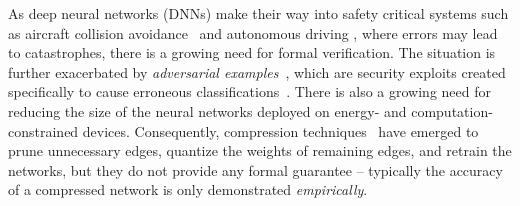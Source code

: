 \newcommand{\diffNN}{\textsc{ReluDiff}}
\newcommand{\ReluVal}{\textsc{ReluVal}}
\newcommand{\DeepPoly}{\textsc{DeepPoly}}

\newcommand{\Reluplex}{\textsc{Reluplex}}
\newcommand{\Neurify}{\textsc{Neurify}}
\newcommand{\RefineZono}{\textsc{RefineZono}}

\newcommand\UB[1]{\mathsf{UB}\big(#1\big)}
\newcommand\LB[1]{\mathsf{LB}\big(#1\big)}

\newcommand\UBconcrete[1]{\overline{\mathsf{UB}}\big(#1\big)}
\newcommand\LBconcrete[1]{\underline{\mathsf{LB}}\big(#1\big)}

\newcommand\ReLU[1]{\proc{ReLU}\left(#1\right)}
\newcommand\ReluOUT[1]{S(#1)}
\newcommand\ReluIN[1]{S^{in}(#1)}
\newcommand\ReluOUTdelta[1]{\delta(#1)}
\newcommand\ReluINdelta[1]{\delta^{in}(#1)}
\newcommand\EdgeOUTdelta[1]{\delta(#1)}

\newcommand\n[0]{n_{k,j}}
\newcommand\np[0]{n'_{k,j}}
\newcommand{\deq}{\Delta}
\newcommand{\deqh}{\hat{\Delta}}

\newcommand{\pluseq}{\mathrel{+}=}





\newcommand{\ignore}[1]{}
\newcommand{\textcode}[1]{\texttt{\footnotesize #1}}
\newcommand{\proc}[1]{\textsc{#1}}



As deep neural networks (DNNs) make their way into safety critical
systems such as aircraft collision avoidance~\cite{JulianKO18} and
autonomous driving \cite{bojarski2016end}, where errors may lead to
catastrophes, there is a growing need for formal verification.  The
situation is further exacerbated by \textit{adversarial
examples}~\cite{szegedy2013intriguing,GoodfellowSS15}, which are
security exploits created specifically to cause erroneous
classifications~\cite{NguyenYC15, XuQE16, Moosavi-Dezfooli16,
KurakinGB17a}.
%
There is also a growing need for reducing the size of the neural
networks deployed on energy- and computation-constrained devices.
Consequently, compression techniques~\cite{HanMD16} have emerged to
prune unnecessary edges, quantize the weights of remaining edges, and
retrain the networks, but they do not provide any formal guarantee --
typically the accuracy of a compressed network is only
demonstrated \textit{empirically}.


